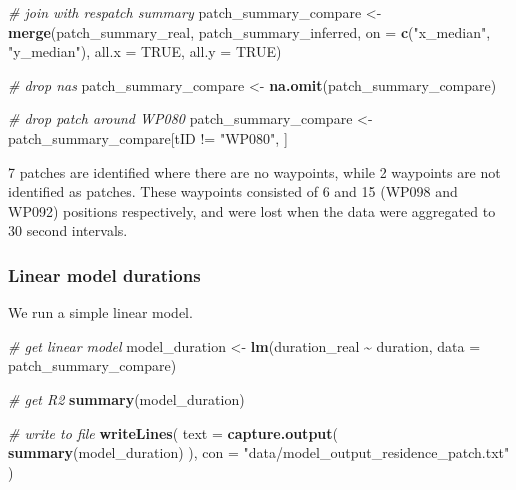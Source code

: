 \documentclass[
]{scrartcl}
\newenvironment{Shaded}{}{}
\newcommand{\CommentTok}[1]{\textcolor[rgb]{0.38,0.63,0.69}{\textit{#1}}}
\newcommand{\DataTypeTok}[1]{\textcolor[rgb]{0.56,0.13,0.00}{#1}}
\newcommand{\KeywordTok}[1]{\textcolor[rgb]{0.00,0.44,0.13}{\textbf{#1}}}
\newcommand{\NormalTok}[1]{#1}
\newcommand{\OperatorTok}[1]{\textcolor[rgb]{0.40,0.40,0.40}{#1}}
\newcommand{\OtherTok}[1]{\textcolor[rgb]{0.00,0.44,0.13}{#1}}
\newcommand{\StringTok}[1]{\textcolor[rgb]{0.25,0.44,0.63}{#1}}
\begin{document}
\begin{Shaded}
\begin{Highlighting}[]
\CommentTok{\# join with respatch summary}
\NormalTok{patch\_summary\_compare <{-}}\StringTok{ }
\StringTok{  }\KeywordTok{merge}\NormalTok{(patch\_summary\_real,}
\NormalTok{        patch\_summary\_inferred, }
        \DataTypeTok{on =} \KeywordTok{c}\NormalTok{(}\StringTok{"x\_median"}\NormalTok{, }\StringTok{"y\_median"}\NormalTok{),}
        \DataTypeTok{all.x =} \OtherTok{TRUE}\NormalTok{, }\DataTypeTok{all.y =} \OtherTok{TRUE}\NormalTok{)}

\CommentTok{\# drop nas}
\NormalTok{patch\_summary\_compare <{-}}\StringTok{ }\KeywordTok{na.omit}\NormalTok{(patch\_summary\_compare)}

\CommentTok{\# drop patch around WP080}
\NormalTok{patch\_summary\_compare <{-}}\StringTok{ }\NormalTok{patch\_summary\_compare[tID }\OperatorTok{!=}\StringTok{ "WP080"}\NormalTok{, ]}
\end{Highlighting}
\end{Shaded}

7 patches are identified where there are no waypoints, while 2 waypoints are not identified as patches. These waypoints consisted of 6 and 15 (WP098 and WP092) positions respectively, and were lost when the data were aggregated to 30 second intervals.

\hypertarget{linear-model-durations}{%
\subsubsection{Linear model durations}\label{linear-model-durations}}

We run a simple linear model.

\begin{Shaded}
\begin{Highlighting}[]
\CommentTok{\# get linear model}
\NormalTok{model\_duration <{-}}\StringTok{ }\KeywordTok{lm}\NormalTok{(duration\_real }\OperatorTok{\textasciitilde{}}\StringTok{ }\NormalTok{duration,}
                     \DataTypeTok{data =}\NormalTok{ patch\_summary\_compare)}

\CommentTok{\# get R2}
\KeywordTok{summary}\NormalTok{(model\_duration)}

\CommentTok{\# write to file}
\KeywordTok{writeLines}\NormalTok{(}
  \DataTypeTok{text =} \KeywordTok{capture.output}\NormalTok{(}
    \KeywordTok{summary}\NormalTok{(model\_duration)}
\NormalTok{  ),}
  \DataTypeTok{con =} \StringTok{"data/model\_output\_residence\_patch.txt"}
\NormalTok{)}
\end{Highlighting}
\end{Shaded}
\end{document}
